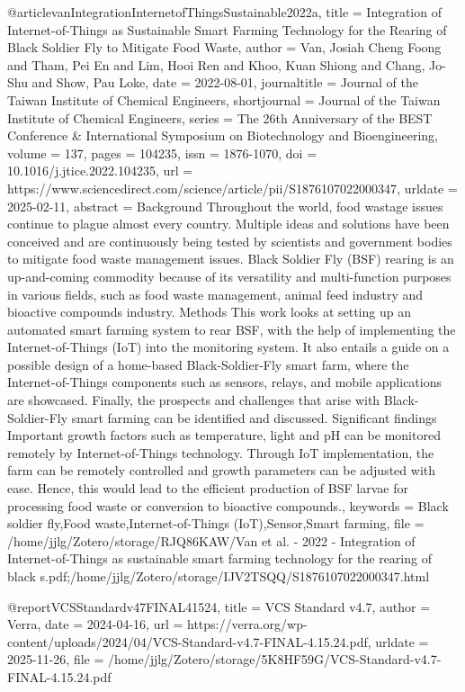 {{{{@article{vanIntegrationInternetofThingsSustainable2022a,
  title = {Integration of {{Internet-of-Things}} as Sustainable Smart Farming Technology for the Rearing of Black Soldier Fly to Mitigate Food Waste},
  author = {Van, Josiah Cheng Foong and Tham, Pei En and Lim, Hooi Ren and Khoo, Kuan Shiong and Chang, Jo-Shu and Show, Pau Loke},
  date = {2022-08-01},
  journaltitle = {Journal of the Taiwan Institute of Chemical Engineers},
  shortjournal = {Journal of the Taiwan Institute of Chemical Engineers},
  series = {The 26th Anniversary of the {{BEST}} Conference \& {{International Symposium}} on {{Biotechnology}} and {{Bioengineering}}},
  volume = {137},
  pages = {104235},
  issn = {1876-1070},
  doi = {10.1016/j.jtice.2022.104235},
  url = {https://www.sciencedirect.com/science/article/pii/S1876107022000347},
  urldate = {2025-02-11},
  abstract = {Background Throughout the world, food wastage issues continue to plague almost every country. Multiple ideas and solutions have been conceived and are continuously being tested by scientists and government bodies to mitigate food waste management issues. Black Soldier Fly (BSF) rearing is an up-and-coming commodity because of its versatility and multi-function purposes in various fields, such as food waste management, animal feed industry and bioactive compounds industry. Methods This work looks at setting up an automated smart farming system to rear BSF, with the help of implementing the Internet-of-Things (IoT) into the monitoring system. It also entails a guide on a possible design of a home-based Black-Soldier-Fly smart farm, where the Internet-of-Things components such as sensors, relays, and mobile applications are showcased. Finally, the prospects and challenges that arise with Black-Soldier-Fly smart farming can be identified and discussed. Significant findings Important growth factors such as temperature, light and pH can be monitored remotely by Internet-of-Things technology. Through IoT implementation, the farm can be remotely controlled and growth parameters can be adjusted with ease. Hence, this would lead to the efficient production of BSF larvae for processing food waste or conversion to bioactive compounds.},
  keywords = {Black soldier fly,Food waste,Internet-of-Things (IoT),Sensor,Smart farming},
  file = {/home/jjlg/Zotero/storage/RJQ86KAW/Van et al. - 2022 - Integration of Internet-of-Things as sustainable smart farming technology for the rearing of black s.pdf;/home/jjlg/Zotero/storage/IJV2TSQQ/S1876107022000347.html}
}

@report{VCSStandardv47FINAL41524,
  title = {{{VCS Standard}} v4.7},
  author = {Verra},
  date = {2024-04-16},
  url = {https://verra.org/wp-content/uploads/2024/04/VCS-Standard-v4.7-FINAL-4.15.24.pdf},
  urldate = {2025-11-26},
  file = {/home/jjlg/Zotero/storage/5K8HF59G/VCS-Standard-v4.7-FINAL-4.15.24.pdf}
}

}}}}
